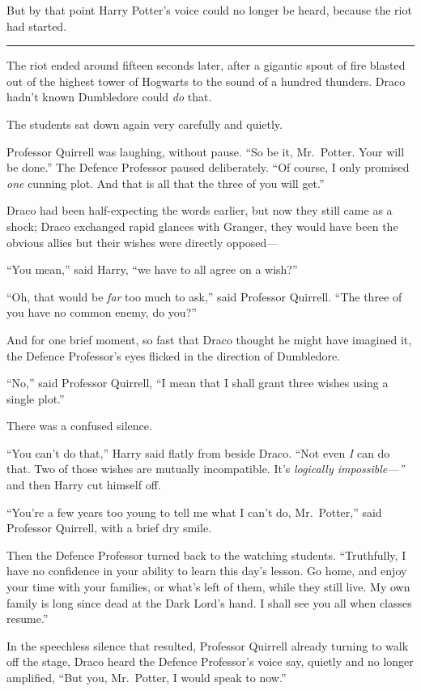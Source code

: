 But by that point Harry Potter's voice could no longer be heard, because
the riot had started.

\begin{center}\rule{3in}{0.4pt}\end{center}

The riot ended around fifteen seconds later, after a gigantic spout of
fire blasted out of the highest tower of Hogwarts to the sound of a
hundred thunders. Draco hadn't known Dumbledore could \emph{do} that.

The students sat down again very carefully and quietly.

Professor Quirrell was laughing, without pause. ``So be it, Mr.~Potter.
Your will be done.'' The Defence Professor paused deliberately. ``Of
course, I only promised \emph{one} cunning plot. And that is all that
the three of you will get.''

Draco had been half-expecting the words earlier, but now they still came
as a shock; Draco exchanged rapid glances with Granger, they would have
been the obvious allies but their wishes were directly opposed---

``You mean,'' said Harry, ``we have to all agree on a wish?''

``Oh, that would be \emph{far} too much to ask,'' said Professor
Quirrell. ``The three of you have no common enemy, do you?''

And for one brief moment, so fast that Draco thought he might have
imagined it, the Defence Professor's eyes flicked in the direction of
Dumbledore.

``No,'' said Professor Quirrell, ``I mean that I shall grant three
wishes using a single plot.''

There was a confused silence.

``You can't do that,'' Harry said flatly from beside Draco. ``Not even
\emph{I} can do that. Two of those wishes are mutually incompatible.
It's \emph{logically impossible---''} and then Harry cut himself off.

``You're a few years too young to tell me what I can't do, Mr.~Potter,''
said Professor Quirrell, with a brief dry smile.

Then the Defence Professor turned back to the watching students.
``Truthfully, I have no confidence in your ability to learn this day's
lesson. Go home, and enjoy your time with your families, or what's left
of them, while they still live. My own family is long since dead at the
Dark Lord's hand. I shall see you all when classes resume.''

In the speechless silence that resulted, Professor Quirrell already
turning to walk off the stage, Draco heard the Defence Professor's voice
say, quietly and no longer amplified, ``But you, Mr.~Potter, I would
speak to now.''

